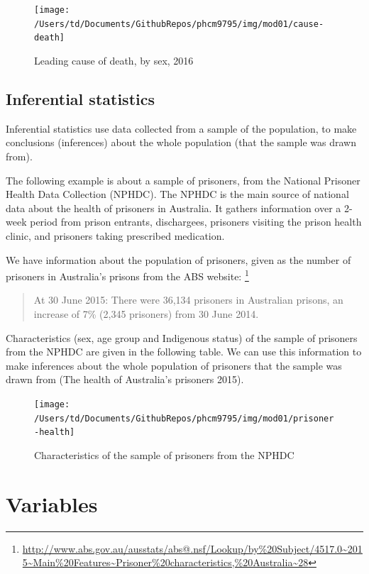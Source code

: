 \documentclass[
]{memoir}
\begin{document}
\begin{figure}
\texttt{[image: /Users/td/Documents/GithubRepos/phcm9795/img/mod01/cause-death]} \caption{Leading cause of death, by sex, 2016}\label{fig:fig1-1}
\end{figure}

\hypertarget{inferential-statistics}{%
\subsection{Inferential statistics}\label{inferential-statistics}}

Inferential statistics use data collected from a sample of the population, to make conclusions (inferences) about the whole population (that the sample was drawn from).

The following example is about a sample of prisoners, from the National Prisoner Health Data Collection (NPHDC). The NPHDC is the main source of national data about the health of prisoners in Australia. It gathers information over a 2-week period from prison entrants, dischargees, prisoners visiting the prison health clinic, and prisoners taking prescribed medication.

We have information about the population of prisoners, given as the number of prisoners in Australia's prisons from the ABS website: \footnote{\url{http://www.abs.gov.au/ausstats/abs@.nsf/Lookup/by\%20Subject/4517.0~2015~Main\%20Features~Prisoner\%20characteristics,\%20Australia~28}}

\begin{quote}
At 30 June 2015: There were 36,134 prisoners in Australian prisons, an increase of 7\% (2,345 prisoners) from 30 June 2014.
\end{quote}

Characteristics (sex, age group and Indigenous status) of the sample of prisoners from the NPHDC are given in the following table. We can use this information to make inferences about the whole population of prisoners that the sample was drawn from (The health of Australia's prisoners 2015).

\begin{figure}
\texttt{[image: /Users/td/Documents/GithubRepos/phcm9795/img/mod01/prisoner-health]} \caption{Characteristics of the sample of prisoners from the NPHDC}\label{fig:fig1-2}
\end{figure}

\hypertarget{variables}{%
\section{Variables}\label{variables}}
\end{document}
